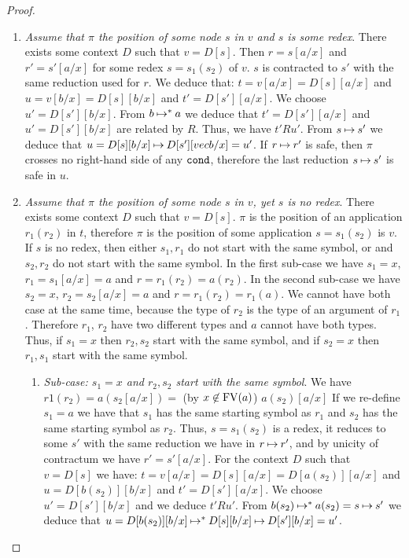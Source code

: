 \begin{proof}
\begin{enumerate}
\item
\emph{Assume that $\pi$ the position of some node $s$ in 
$v$ and \emph{$s$ is some redex}}.  
There exists some context $D$ such that $v = D[s]$. Then $r=s[a/x]$
and $r'=s'[a/x]$ for some redex $s=s_1(s_2)$ of $v$.
$s$ is contracted to $s'$ with the same reduction used for $r$.
We deduce that:
$ t  = v[a/x] = D[s][a/x]$ and 
$ u = v[b/x] = D[s][b/x]$ and
$ t' = D[s'][a/x]$. 
We choose $u' = D[s'][b/x]$. 
From $b \mathbin{\mapsto}^{*} a$ we deduce that
$t' = D[s'][a/x]$ and 
$u' = D[s'][b/x]$ are related by $R$.
Thus, we have $t' R u'$. From  $s \mathbin{\mapsto}   s'$ we deduce that 
$
u = D[s][b/x]
\mathbin{\mapsto}   
D[s'][vec{b}/x] = u'
$.
If $r \mathbin{\mapsto} r'$ is safe, then 
$\pi$ crosses no right-hand side of any ${\tt cond}$, therefore the last reduction
$s \mathbin{\mapsto} s'$ is safe in $u$.


\item
\emph{Assume that $\pi$ the position of some node $s$ in 
$v$,  yet \emph{$s$ is no redex}}.  
There exists some context $D$ such that $v = D[s]$. 
$\pi$ is the position of an application $r_1(r_2)$ in $t$, therefore
$\pi$ is the position of some application $s = s_1(s_2)$ is $v$.
If $s$ is no redex, then either $s_1, r_1$ do not start with the same symbol,
or and $s_2, r_2$ do not start with the same symbol. In the first sub-case
we have $s_1=x$, $r_1 = s_1[a/x] = a$ and $r = r_1(r_2) = a(r_2)$.
In the second sub-case
we have $s_2=x$, $r_2 = s_2[a/x] = a$ and $r = r_1(r_2) = r_1(a)$.
We cannot have both case at the same time, 
because the type of $r_2$ is the type of an argument of $r_1$. 
Therefore $r_1$, $r_2$ have two different types and $a$ cannot have both types.
Thus, if $s_1=x$ then $r_2,s_2$ start with the same symbol, and if
$s_2=x$ then $r_1,s_1$ start with the same symbol.
\begin{enumerate}
\item
\emph{Sub-case: $s_1=x$ and $r_2,s_2$ start with the same symbol}. 
We have $r1(r_2) = a(s_2[a/x]) = $ (by $x \not \in {{\rm FV}}(a)$) $ a(s_2)[a/x]$ 
If we re-define $s_1=a$ we have that $s_1$ has the same starting symbol
as $r_1$ and $s_2$ has the same starting symbol as $r_2$.
Thus, $s = s_1(s_2)$ is a redex, it reduces to some $s'$ with the same reduction
we have in $r \mathbin{\mapsto} r'$, and by unicity of contractum we have $r' = s'[a/x]$.
For the context $D$ such that $v=D[s]$
we have: 
$ t  = v[a/x] = D[s][a/x] = D[a(s_2)][a/x]$ and 
$ u = D[b(s_2)][b/x] $ and
$ t' = D[s'][a/x]$. 
We choose $u' = D[s'][b/x]$ 
and we deduce $t' R u'$. 
From $b(s_2) \mathbin{\mapsto}^{*} a(s_2) = s \mathbin{\mapsto}   s'$
we deduce that $u = D[b(s_2)][b/x] \mathbin{\mapsto}^{*} 
D[s][b/x] \mathbin{\mapsto} D[s'][b/x] = u'$.


\end{enumerate}
\end{enumerate}
\end{proof}
